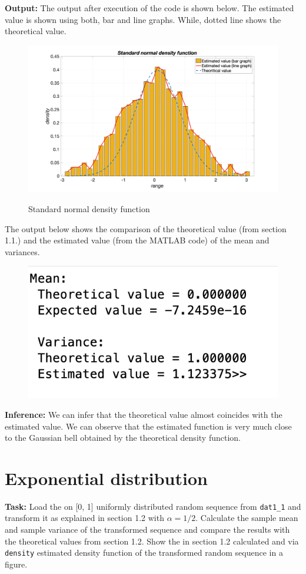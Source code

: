 \noindent \textbf{Output:}
\noindent The output after execution of the code is shown below. The estimated value is shown using both, bar and line graphs. While, dotted line shows the theoretical value.
\begin{figure}[H]
\centering
{\includegraphics[scale=0.16]{ass1_1.png}}
\caption{Standard normal density function}
\label{Standard normal density function}
\end{figure}
\noindent The output below shows the comparison of the theoretical value (from section 1.1.) and the estimated value (from the MATLAB code) of the mean and variances.
\begin{figure}[H]
\centering
{\includegraphics[scale=0.63]{ass1_2.png}}
\end{figure}
\noindent \textbf{Inference:} We can infer that the theoretical value almost coincides with the estimated value. We can observe that the estimated function is very much close to the Gaussian bell obtained by the theoretical density function.



\section{ Exponential distribution } \label{ Exponential distribution }
\noindent \textbf{Task:} Load the on [0, 1] uniformly distributed random sequence from \texttt{dat1\_1} and transform it as explained in section 1.2 with $\alpha = 1/2.$ Calculate the sample mean and sample variance of the transformed sequence and compare the results with the theoretical values from section 1.2. Show the in section 1.2 calculated and via \texttt{density} estimated density function of the transformed random sequence in a figure. 

